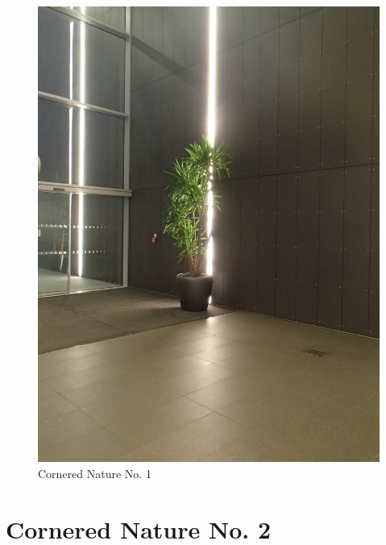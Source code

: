 \documentclass{book}
\begin{document}
\begin{figure}
\centering
\includegraphics[width=\textwidth,angle=-90]{figures/P1050156.JPG}
\caption{Cornered Nature No. 1}
\end{figure}

\chapter{Cornered Nature No. 2}
\end{document}
